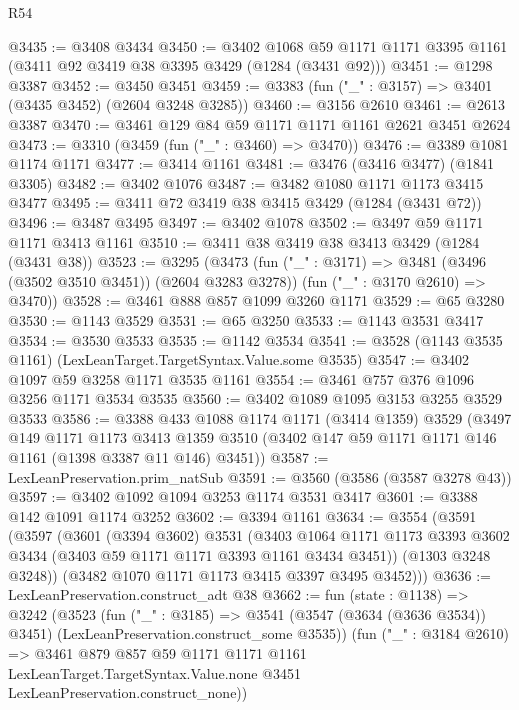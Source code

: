 \begin{lexlean}{R54}
\begin{coremodule}
@3435 := @3408 @3434
@3450 := @3402
    @1068
    @59
    @1171
    @1171
    @3395
    @1161
    (@3411 @92 @3419 @38 @3395 @3429 (@1284 (@3431 @92)))
@3451 := @1298 @3387
@3452 := @3450 @3451
@3459 := @3383 (fun ("_" : @3157) => @3401 (@3435 @3452) (@2604 @3248 @3285))
@3460 := @3156 @2610
@3461 := @2613 @3387
@3470 := @3461 @129 @84 @59 @1171 @1171 @1161 @2621 @3451 @2624
@3473 := @3310 (@3459 (fun ("_" : @3460) => @3470))
@3476 := @3389 @1081 @1174 @1171
@3477 := @3414 @1161
@3481 := @3476 (@3416 @3477) (@1841 @3305)
@3482 := @3402 @1076
@3487 := @3482 @1080 @1171 @1173 @3415 @3477
@3495 := @3411 @72 @3419 @38 @3415 @3429 (@1284 (@3431 @72))
@3496 := @3487 @3495
@3497 := @3402 @1078
@3502 := @3497 @59 @1171 @1171 @3413 @1161
@3510 := @3411 @38 @3419 @38 @3413 @3429 (@1284 (@3431 @38))
@3523 := @3295
    (@3473
      (fun ("_" : @3171) => @3481 (@3496 (@3502 @3510 @3451)) (@2604 @3283 @3278))
      (fun ("_" : @3170 @2610) => @3470))
@3528 := @3461 @888 @857 @1099 @3260 @1171
@3529 := @65 @3280
@3530 := @1143 @3529
@3531 := @65 @3250
@3533 := @1143 @3531 @3417
@3534 := @3530 @3533
@3535 := @1142 @3534
@3541 := @3528 (@1143 @3535 @1161) (LexLeanTarget.TargetSyntax.Value.some @3535)
@3547 := @3402 @1097 @59 @3258 @1171 @3535 @1161
@3554 := @3461 @757 @376 @1096 @3256 @1171 @3534 @3535
@3560 := @3402 @1089 @1095 @3153 @3255 @3529 @3533
@3586 := @3388
    @433
    @1088
    @1174
    @1171
    (@3414 @1359)
    @3529
    (@3497
      @149
      @1171
      @1173
      @3413
      @1359
      @3510
      (@3402 @147 @59 @1171 @1171 @146 @1161 (@1398 @3387 @11 @146) @3451))
@3587 := LexLeanPreservation.prim_natSub
@3591 := @3560 (@3586 (@3587 @3278 @43))
@3597 := @3402 @1092 @1094 @3253 @1174 @3531 @3417
@3601 := @3388 @142 @1091 @1174 @3252
@3602 := @3394 @1161
@3634 := @3554
    (@3591
      (@3597
        (@3601
          (@3394 @3602)
          @3531
          (@3403
            @1064
            @1171
            @1173
            @3393
            @3602
            @3434
            (@3403 @59 @1171 @1171 @3393 @1161 @3434 @3451))
          (@1303 @3248 @3248))
        (@3482 @1070 @1171 @1173 @3415 @3397 @3495 @3452)))
@3636 := LexLeanPreservation.construct_adt @38
@3662 := fun (state : @1138) =>
  @3242
    (@3523
      (fun ("_" : @3185) =>
      @3541 (@3547 (@3634 (@3636 @3534)) @3451) (LexLeanPreservation.construct_some @3535))
      (fun ("_" : @3184 @2610) =>
      @3461
        @879
        @857
        @59
        @1171
        @1171
        @1161
        LexLeanTarget.TargetSyntax.Value.none
        @3451
        LexLeanPreservation.construct_none))

\end{coremodule}
\end{lexlean}
